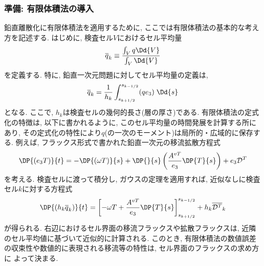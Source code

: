 \subsubsection*{準備: 有限体積法の導入}
鉛直離散化に有限体積法を適用するために, ここでは有限体積法の基本的な考え方を記述する. 
はじめに, 検査セル$V$におけるセル平均量
\begin{equation*}
  \overline{q}_k 
   \equiv \dfrac{\int_V q \Dd{V}}{\int_V \Dd{V}} 
\end{equation*}
を定義する. 
特に, 鉛直一次元問題に対してセル平均量の定義は, 
\begin{equation*}
  \overline{q}_k 
   = \dfrac{1}{h_k} 
     \int_{s_{k+1/2}}^{s_{k-1/2}} (q e_3)  \; \Dd{s}
\end{equation*}
となる. 
ここで, $h_k$は検査セルの幾何的長さ(層の厚さ)である.  
有限体積法の定式化の特徴は, 以下に書かれるように, このセル平均量の時間発展を計算する所にあり, 
その定式化の特性により$q$(の一次のモーメント)は局所的・広域的に保存する.  
例えば, フラックス形式で書かれた鉛直一次元の移流拡散方程式
\begin{equation}
  \DP{(e_3 T)}{t} 
   = - \DP{(\omega T)}{s} + \DP{}{s}\left(\dfrac{A^{vT}}{e_3}\DP{T}{s} \right)
     + e_3 \mathcal{D}^T
\label{eq:fvm_fundamental_1D_AdvDiffEq}
\end{equation}
を考える. 
検査セルに渡って積分し, ガウスの定理を適用すれば, 近似なしに検査セル$k$に対する方程式
\begin{align}
  \DP{(h_k \overline{q}_k)}{t}
  =
    \left[  - \omega T  + \dfrac{A^{vT}}{e_3} \DP{T}{s}
    \right]^{s_{k-1/2}}_{s_{k+1/2}} 
    + h_k \overline{\mathcal{D}^T}_k
\label{eq:fvm_fundamental_1D_AdvDiffEq_volaverage}
\end{align}
が得られる. 
右辺におけるセル界面の移流フラックスや拡散フラックスは, 近隣のセル平均値に基づいて近似的に計算される. 
このとき, 有限体積法の数値誤差の収束性や数値的に表現される移流等の特性は, セル界面のフラックスの求め方に
よって決まる. 

